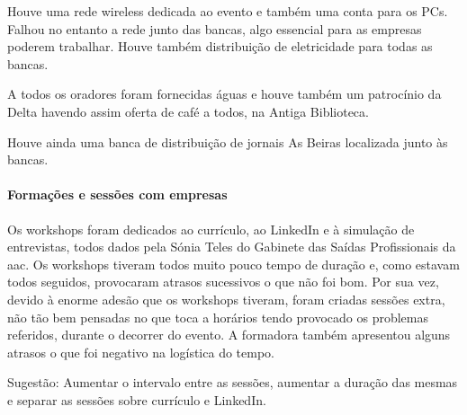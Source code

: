 Houve uma rede wireless dedicada ao evento e também uma conta para os PCs. Falhou no entanto a rede junto das bancas, algo essencial para as empresas poderem trabalhar. Houve também distribuição de eletricidade para todas as bancas. 

A todos os oradores foram fornecidas águas e houve também um patrocínio da Delta havendo assim oferta de café a todos, na Antiga Biblioteca. 

Houve ainda uma banca de distribuição de jornais As Beiras localizada junto às bancas. 

\paragraph{Formações e sessões com empresas}

Os workshops foram dedicados ao currículo, ao LinkedIn e à simulação de entrevistas, todos dados pela Sónia Teles do Gabinete das Saídas Profissionais da \acrshort{aac}. Os workshops tiveram todos muito pouco tempo de duração e, como estavam todos seguidos, provocaram atrasos sucessivos o que não foi bom. Por sua vez, devido à enorme adesão que os workshops tiveram, foram criadas sessões extra, não tão bem pensadas no que toca a horários tendo provocado os problemas referidos, durante o decorrer do evento. A formadora também apresentou alguns atrasos o que foi negativo na logística do tempo. 

Sugestão: Aumentar o intervalo entre as sessões, aumentar a duração das mesmas e separar as sessões sobre currículo e LinkedIn. 